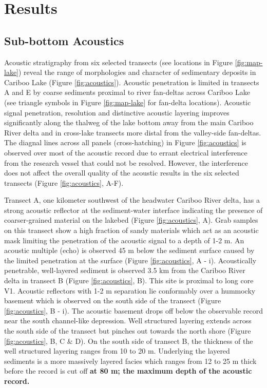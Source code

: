 \documentclass[Royal,times,doublespace,sageh]{sagej}
\begin{document}
\hypertarget{results}{%
\section{Results}\label{results}}

\hypertarget{sub-bottom-acoustics}{%
\subsection{Sub-bottom Acoustics}\label{sub-bottom-acoustics}}

Acoustic stratigraphy from six selected transects (see locations in
Figure \ref{fig:map-lake}) reveal the range of morphologies and
character of sedimentary deposits in Cariboo Lake (Figure
\ref{fig:acoustics}). Acoustic penetration is limited in transects A and
E by coarse sediments proximal to river fan-deltas across Cariboo Lake
(see triangle symbols in Figure \ref{fig:map-lake} for fan-delta
locations). Acoustic signal penetration, resolution and distinctive
acoustic layering improves significantly along the thalweg of the lake
bottom away from the main Cariboo River delta and in cross-lake
transects more distal from the valley-side fan-deltas. The diagnal lines
across all panels (cross-hatching) in Figure \ref{fig:acoustics} is
observed over most of the acoustic record due to errant electrical
interference from the research vessel that could not be resolved.
However, the interference does not affect the overall quality of the
acoustic results in the six selected transects (Figure
\ref{fig:acoustics}, A-F).

Transect A, one kilometer southwest of the headwater Cariboo River
delta, has a strong acoustic reflector at the sediment-water interface
indicating the presence of coarser-grained material on the lakebed
(Figure \ref{fig:acoustics}, A). Grab samples on this transect show a
high fraction of sandy materials which act as an acoustic mask limiting
the penetration of the acoustic signal to a depth of 1-2 m. An acoustic
multiple (echo) is observed 45 m below the sediment surface caused by
the limited penetration at the surface (Figure \ref{fig:acoustics}, A -
i). Acoustically penetrable, well-layered sediment is observed 3.5 km
from the Cariboo River delta in transect B (Figure \ref{fig:acoustics},
B). This site is proximal to long core V1. Acoustic reflectors with 1-2
m separation lie conformably over a hummocky basement which is observed
on the south side of the transect (Figure \ref{fig:acoustics}, B - i).
The acoustic basement drops off below the observable record near the
south channel-like depression. Well structured layering extends across
the south side of the transect but pinches out towards the north shore
(Figure \ref{fig:acoustics}, B, C \& D). On the south side of transect
B, the thickness of the well structured layering ranges from 10 to 20 m.
Underlying the layered sediments is a more massively layered facies
which ranges from 12 to 25 m thick before the record is cut off
\textbf{at 80 m; the maximum depth of the acoustic record.}
\end{document}
